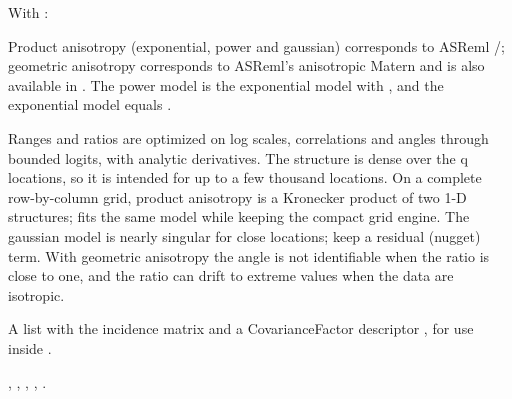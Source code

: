 \documentclass[a4paper]{book}
\begin{document}
%
\begin{Details}\relax
With :

Product anisotropy (exponential, power and gaussian) corresponds to ASReml
/; geometric anisotropy corresponds to ASReml's
anisotropic Matern and is also available in . The power
model is the exponential model with , and the
exponential model equals .

Ranges and ratios are optimized on log scales, correlations and angles through
bounded logits, with analytic derivatives. The structure is dense over the q
locations, so it is intended for up to a few thousand locations. On a complete
row-by-column grid, product anisotropy is a Kronecker product of two 1-D
structures; 
fits the same model while keeping the compact grid engine. The gaussian model
is nearly singular for close locations; keep a residual (nugget) term. With
geometric anisotropy the angle is not identifiable when the ratio is close to
one, and the ratio can drift to extreme values when the data are isotropic.
\end{Details}
%
\begin{Value}
A list with the incidence matrix  and a CovarianceFactor descriptor , for use inside .
\end{Value}
%
\begin{SeeAlso}\relax
{}, , , , .
\end{SeeAlso}
%
\begin{Examples}
\end{Examples}
\end{document}
